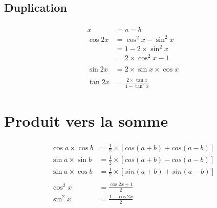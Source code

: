 \documentclass[a4paper, 12pt]{article}
\begin{document}
\begin{center}
		\item \subsection*{Duplication}
		\vspace{-0.4cm}
		\begin{gather*}
			\begin{split}
				x &= a = b\\
				\cos{2x} &= \cos^2{x}-\sin^2{x}\\
				&= 1 - 2\times\sin^2{x}\\
				&= 2\times\cos^2{x} - 1\\
				\\
				\sin{2x} &= 2\times\sin{x}\times\cos{x}\\
				\\
				\tan{2x} &= \frac{2\times\tan{x}}{1-\tan^2{x}}
			\end{split}
		\end{gather*}
	\end{center}
	
	\vspace{2cm}
	\section{Produit vers la somme}
	\vspace{-0.4cm}
	\begin{gather*}
		\begin{split}
			\cos{a}\times\cos{b} &= \frac{1}{2}\times\left[cos\left(a+b\right) + cos\left(a-b\right)\right]\\
			\sin{a}\times\sin{b} &= \frac{1}{2}\times\left[cos\left(a+b\right) - cos\left(a-b\right)\right]\\
			\sin{a}\times\cos{b} &= \frac{1}{2}\times\left[sin\left(a+b\right) + sin\left(a-b\right)\right]\\
			\\
			\cos^2{x} &= \frac{\cos{2x}+1}{2}\\
			\sin^2{x} &= \frac{1-\cos{2x}}{2}
		\end{split}
	\end{gather*}

	\vspace{0.5cm}
\end{document}
